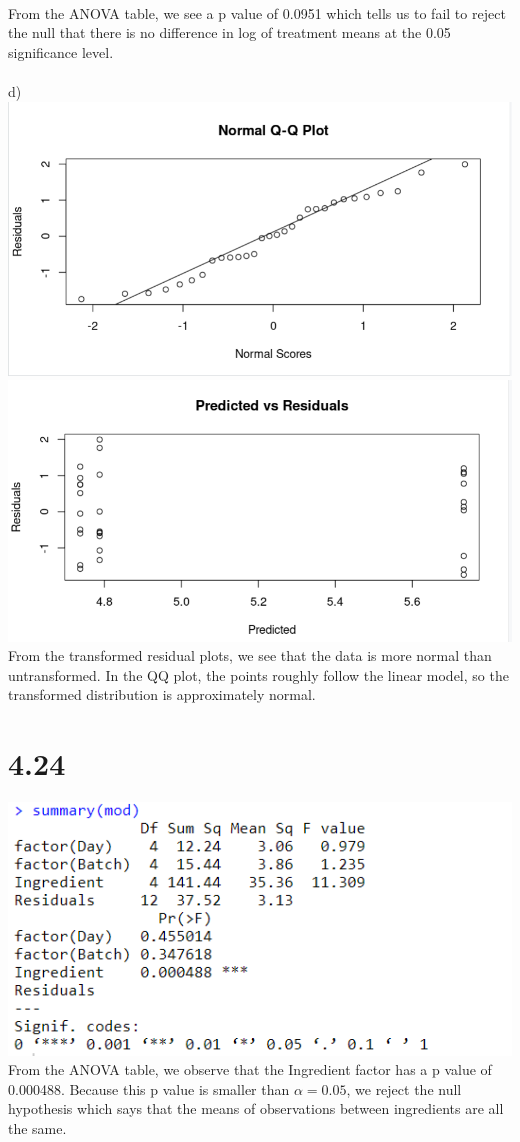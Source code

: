 \documentclass{article}
\begin{document}
\\From the ANOVA table, we see a p value of 0.0951 which tells us to fail to reject the null that there is no difference in log of treatment means at the 0.05 significance level.
\\
\\d)
\\\includegraphics{4.15dQQ.PNG}
\\\includegraphics{4.15dRes.PNG}
\\From the transformed residual plots, we see that the data is more normal than untransformed. In the QQ plot, the points roughly follow the linear model, so the transformed distribution is approximately normal.

\section*{4.24}
\includegraphics{4.24.PNG}
\\From the ANOVA table, we observe that the Ingredient factor has a p value of 0.000488. Because this p value is smaller than $\alpha = 0.05$, we reject the null hypothesis which says that the means of observations between ingredients are all the same.
\newpage
\end{document}
